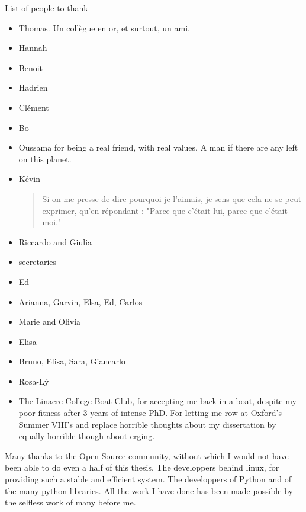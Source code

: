 List of people to thank

\begin{itemize}
	\item Thomas. Un collègue en or, et surtout, un ami.
	\item Hannah
	\item Benoit
        \item Hadrien
        \item Cl\'ement
        \item Bo
        \item Oussama for being a real friend, with real values. A man if there
            are any left on this planet.
        \item K\'evin
    \begin{quote}
        Si on me presse de dire pourquoi je l'aimais, je sens que cela ne se peut
        exprimer, qu'en r\'epondant : "Parce que c'\'etait lui, parce que c'\'etait moi."
    \end{quote}
	\item Riccardo and Giulia
	\item secretaries
	\item Ed
	\item Arianna, Garvin, Elsa, Ed, Carlos
	\item Marie and Olivia
	\item Elisa
	\item Bruno, Elisa, Sara, Giancarlo
	\item Rosa-L\'y
        \item The Linacre College Boat Club, for accepting me back in a boat,
            despite my poor fitness after $3$ years of intense PhD. For letting
            me row at Oxford's Summer VIII's and replace horrible thoughts about
            my dissertation by equally horrible though about erging.
\end{itemize}

\noindent Many thanks to the Open Source community, without which I would not
have been able to do even a half of this thesis. The developpers behind linux,
for providing such a stable and efficient system. The developpers of Python and
of the many python libraries. All the work I have done has been made possible by
the selfless work of many before me.


\endgroup
